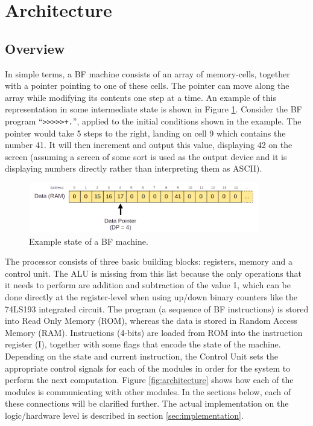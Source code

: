 \section{Architecture} \label{sec:architecture}
\subsection{Overview} \label{sec:architecture:overview}
In simple terms, a BF machine consists of an array of memory-cells, together with a pointer pointing to one of these cells. The pointer can move along the array while modifying its contents one step at a time. An example of this representation in some intermediate state is shown in Figure \ref{fig:simplerepresentation}. Consider the BF program ``\texttt{>>>>>+.}'', applied to the initial conditions shown in the example. The pointer would take 5 steps to the right, landing on cell 9 which contains the number 41. It will then increment and output this value, displaying 42 on the screen (assuming a screen of some sort is used as the output device and it is displaying numbers directly rather than interpreting them as ASCII).

\begin{figure}[H]
  \centering
  \includegraphics[width=0.9\textwidth]{img/simple_representation}
  \caption{Example state of a BF machine.}
  \label{fig:simplerepresentation}
\end{figure}


The processor consists of three basic building blocks: registers, memory and a control unit. The ALU is missing from this list because the only operations that it needs to perform are addition and subtraction of the value 1, which can be done directly at the register-level when using up/down binary counters like the 74LS193 integrated circuit. The program (a sequence of BF instructions) is stored into Read Only Memory (ROM), whereas the data is stored in Random Access Memory (RAM). Instructions (4-bits) are loaded from ROM into the instruction register (I), together with some flags that encode the state of the machine. Depending on the state and current instruction, the Control Unit sets the appropriate control signals for each of the modules in order for the system to perform the next computation. Figure \ref{fig:architecture} shows how each of the modules is communicating with other modules. In the sections below, each of these connections will be clarified further. The actual implementation on the logic/hardware level is described in section \ref{sec:implementation}.



